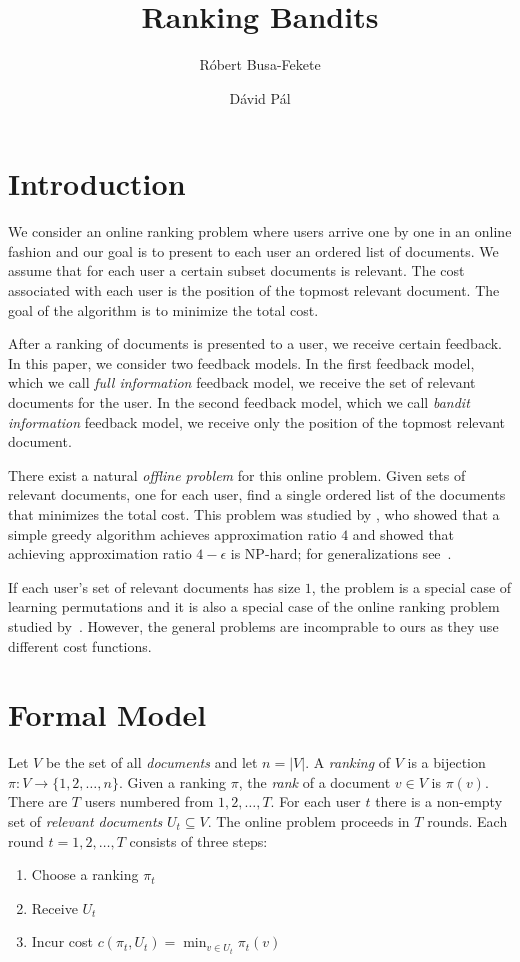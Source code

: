 \documentclass{article}
\begin{document}
\title{Ranking Bandits}
\author{R\'obert Busa-Fekete \and D\'avid P\'al}
\maketitle

\section{Introduction}

We consider an online ranking problem where users arrive one by one in an online
fashion and our goal is to present to each user an ordered list of documents. We
assume that for each user a certain subset documents is relevant. The cost
associated with each user is the position of the topmost relevant document. The
goal of the algorithm is to minimize the total cost.

After a ranking of documents is presented to a user, we receive certain
feedback. In this paper, we consider two feedback models. In the first feedback
model, which we call \emph{full information} feedback model, we receive the set
of relevant documents for the user. In the second feedback model, which we call
\emph{bandit information} feedback model, we receive only the position of the
topmost relevant document.

There exist a natural \emph{offline problem} for this online problem. Given sets
of relevant documents, one for each user, find a single ordered list of the
documents that minimizes the total cost. This problem was studied by
\cite{Feige-Lovasz-Tetali-2004}, who showed that a simple greedy algorithm
achieves approximation ratio $4$ and showed that achieving approximation ratio
$4-\epsilon$ is NP-hard; for generalizations see~\cite{Azar-Gamzu-Yin-2009}.

If each user's set of relevant documents has size $1$, the problem is a special
case of learning permutations \citep{Helmbold-Warmuth-2009,
Yasutake-Hatano-Kijima-Takimoto-Takeda-2011} and it is also a special case of
the online ranking problem studied by~\cite{Ailon-2014}. However, the general
problems are incomprable to ours as they use different cost functions.

\section{Formal Model}

Let $V$ be the set of all \emph{documents} and let $n = |V|$. A \emph{ranking}
of $V$ is a bijection $\pi:V \to \{1,2,\dots,n\}$. Given a ranking $\pi$, the
\emph{rank} of a document $v \in V$ is $\pi(v)$. There are $T$ users numbered
from $1,2,\dots,T$. For each user $t$ there is a non-empty set of \emph{relevant
documents} $U_t \subseteq V$. The online problem proceeds in $T$ rounds. Each
round $t=1,2,\dots,T$ consists of three steps:
\begin{enumerate}
\item Choose a ranking $\pi_t$
\item Receive $U_t$
\item Incur cost $c(\pi_t, U_t) = \min_{v \in U_t} \pi_t(v)$
\end{enumerate}
\end{document}
